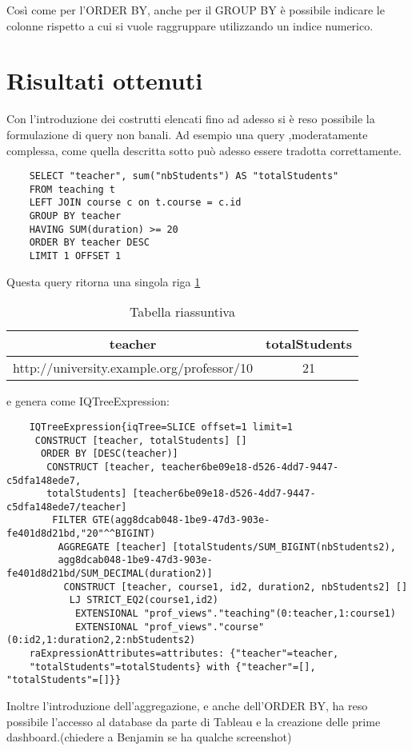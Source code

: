 Così come per l'ORDER BY, anche per il GROUP BY è possibile indicare le colonne rispetto a cui si vuole raggruppare utilizzando un indice numerico.

\section{Risultati ottenuti}
Con l'introduzione dei costrutti elencati fino ad adesso si è reso possibile la formulazione di query non banali. Ad esempio una query ,moderatamente
complessa, come quella descritta sotto può adesso essere tradotta correttamente.
\begin{verbatim}
    SELECT "teacher", sum("nbStudents") AS "totalStudents"
    FROM teaching t 
    LEFT JOIN course c on t.course = c.id 
    GROUP BY teacher 
    HAVING SUM(duration) >= 20
    ORDER BY teacher DESC
    LIMIT 1 OFFSET 1
\end{verbatim}
Questa query ritorna una singola riga \ref{tab:complex}
\begin{table}[ht]
    \small
    \centering
    \caption{Tabella riassuntiva}
    \label{tab:complex}
    \begin{tabular}{| c | c | }
        \hline
        teacher                                    & totalStudents  \\ \hline
        http://university.example.org/professor/10 & 21             \\ \hline
    \end{tabular}
\end{table}

\noindent
e genera come IQTreeExpression:
\begin{verbatim}
    IQTreeExpression{iqTree=SLICE offset=1 limit=1
     CONSTRUCT [teacher, totalStudents] []
      ORDER BY [DESC(teacher)]
       CONSTRUCT [teacher, teacher6be09e18-d526-4dd7-9447-c5dfa148ede7,
       totalStudents] [teacher6be09e18-d526-4dd7-9447-c5dfa148ede7/teacher]
        FILTER GTE(agg8dcab048-1be9-47d3-903e-fe401d8d21bd,"20"^^BIGINT)
         AGGREGATE [teacher] [totalStudents/SUM_BIGINT(nbStudents2), 
         agg8dcab048-1be9-47d3-903e-fe401d8d21bd/SUM_DECIMAL(duration2)]
          CONSTRUCT [teacher, course1, id2, duration2, nbStudents2] []
           LJ STRICT_EQ2(course1,id2)
            EXTENSIONAL "prof_views"."teaching"(0:teacher,1:course1)
            EXTENSIONAL "prof_views"."course"(0:id2,1:duration2,2:nbStudents2)
    raExpressionAttributes=attributes: {"teacher"=teacher, 
    "totalStudents"=totalStudents} with {"teacher"=[], "totalStudents"=[]}}
\end{verbatim}
Inoltre l'introduzione dell'aggregazione, e anche dell'ORDER BY, ha reso possibile l'accesso al database da parte di Tableau e la creazione delle prime 
dashboard.(chiedere a Benjamin se ha qualche screenshot)
